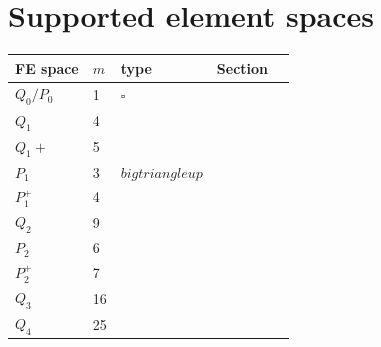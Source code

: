 \section*{Supported element spaces}

\begin{tabular}{lllll}
\hline
FE space  & $m$ & type  & Section  \\
\hline
\hline
$Q_0/P_0$ & 1   & $\square$ & \\
$Q_1$     & 4   &       & \\
$Q_1+$    & 5   &       & \\
$P_1$     & 3   & $bigtriangleup$ & \\
$P_1^+$   & 4   &   &    \\
$Q_2$     & 9   &   &    \\
$P_2$     & 6   &   &    \\
$P_2^+$   & 7   &   &    \\
$Q_3$     & 16  &   &    \\
$Q_4$     & 25  &   &    \\
\hline
\end{tabular}

